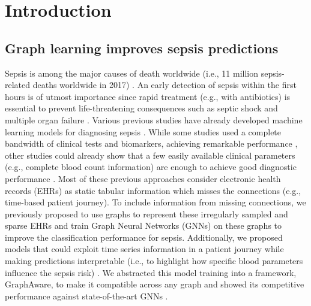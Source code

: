 \documentclass[pdflatex,sn-mathphys-num,lineno]{sn-jnl}
\theoremstyle{thmstyleone}%
\theoremstyle{thmstyletwo}%
\theoremstyle{thmstylethree}%
\begin{document}


\maketitle

\section{Introduction}\label{sec1}

\subsection{Graph learning improves sepsis predictions}
Sepsis is among the major causes of death worldwide (i.e., 11 million sepsis-related deaths worldwide in 2017) \cite{Rudd2020-lk}. An early detection of sepsis within the first hours is of utmost importance since rapid treatment (e.g., with antibiotics) is essential to prevent life-threatening consequences such as septic shock and multiple organ failure \cite{Evans2021}. Various previous studies have already developed machine learning models for diagnosing sepsis \cite{9005564,chenzhangtang2021,steinbach2024applying,walke2025sbc}. While some studies used a complete bandwidth of clinical tests and biomarkers, achieving remarkable performance \cite{9005564,chenzhangtang2021}, other studies could already show that a few easily available clinical parameters (e.g., complete blood count information) are enough to achieve good diagnostic performance \cite{steinbach2024applying}. Most of these previous approaches consider electronic health records (EHRs) as static tabular information which misses the connections (e.g., time-based patient journey). To include information from missing connections, we previously proposed to use graphs to represent these irregularly sampled and sparse EHRs \cite{walke2023edges} and train Graph Neural Networks (GNNs) on these graphs to improve the classification performance for sepsis. Additionally, we proposed models that could exploit time series information in a patient journey while making predictions interpretable (i.e., to highlight how specific blood parameters influence the sepsis risk) \cite{walke2025sbc}. We abstracted this model training into a framework, GraphAware, to make it compatible across any graph and showed its competitive performance against state-of-the-art GNNs \cite{walke2026graphaware}.
\end{document}
